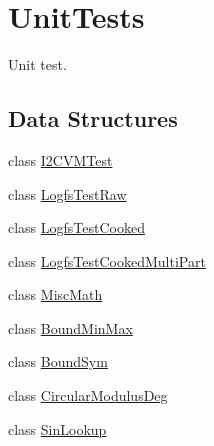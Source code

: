 \hypertarget{group___unit_tests}{\section{Unit\-Tests}
\label{group___unit_tests}
}


Unit test.  


\subsection*{Data Structures}
\begin{DoxyCompactItemize}
\item 
class \hyperlink{class_i2_c_v_m_test}{I2\-C\-V\-M\-Test}
\item 
class \hyperlink{class_logfs_test_raw}{Logfs\-Test\-Raw}
\item 
class \hyperlink{class_logfs_test_cooked}{Logfs\-Test\-Cooked}
\item 
class \hyperlink{class_logfs_test_cooked_multi_part}{Logfs\-Test\-Cooked\-Multi\-Part}
\item 
class \hyperlink{class_misc_math}{Misc\-Math}
\item 
class \hyperlink{class_bound_min_max}{Bound\-Min\-Max}
\item 
class \hyperlink{class_bound_sym}{Bound\-Sym}
\item 
class \hyperlink{class_circular_modulus_deg}{Circular\-Modulus\-Deg}
\item 
class \hyperlink{class_sin_lookup}{Sin\-Lookup}
\end{DoxyCompactItemize}

